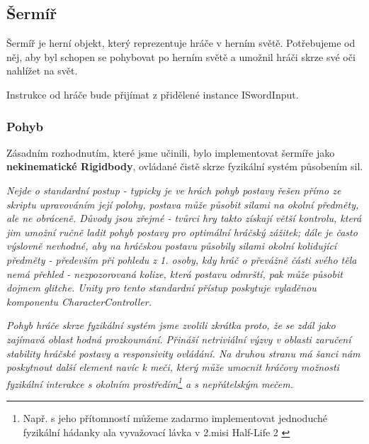 \pagebreak



\subsection{Šermíř}

Šermíř je herní objekt, který reprezentuje hráče v herním světě. Potřebujeme od něj, aby byl schopen se pohybovat po herním světě a umožnil hráči skrze své oči nahlížet na svět. 

Instrukce od hráče bude přijímat z přidělené instance ISwordInput.

\subsubsection*{Pohyb}

Zásadním rozhodnutím, které jsme učinili, bylo implementovat šermíře jako \textbf{nekinematické Rigidbody}, ovládané čistě skrze fyzikální systém působením sil. 

\textit{Nejde o standardní postup - typicky je ve hrách pohyb postavy řešen přímo ze skriptu upravováním její polohy, postava může působit silami na okolní předměty, ale ne obráceně. Důvody jsou zřejmé - tvůrci hry takto získají větší kontrolu, která jim umožní ručně ladit pohyb postavy pro optimální hráčský zážitek; dále je často výslovně nevhodné, aby na hráčskou postavu působily silami okolní kolidující předměty - především při pohledu z 1. osoby, kdy hráč o převážně části svého těla nemá přehled - nezpozorovaná kolize, která postavu odmrští, pak může působit dojmem glitche. Unity pro tento standardní přístup poskytuje vyladěnou komponentu CharacterController.}

\textit{Pohyb hráče skrze fyzikální systém jsme zvolili zkrátka proto, že se zdál jako zajímavá oblast hodná prozkoumání. Přináší netriviální výzvy v oblasti zaručení stability hráčské postavy a responsivity ovládání. Na druhou stranu má šanci nám poskytnout další element navíc k meči, který může umocnit hráčovy možnosti fyzikální interakce s okolním prostředím\footnote{Např. s jeho přítomností můžeme zadarmo implementovat jednoduché fyzikální hádanky ala vyvažovací lávka v 2.misi Half-Life 2 \cite{HalfLife2}} a s nepřátelským mečem.}

